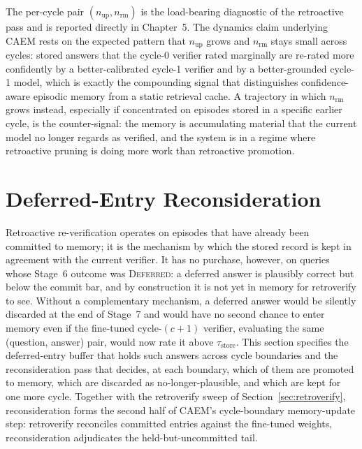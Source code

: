 The per-cycle pair $(n_{\text{up}}, n_{\text{rm}})$ is the load-bearing diagnostic of the retroactive pass and is reported directly in Chapter~5. The dynamics claim underlying CAEM rests on the expected pattern that $n_{\text{up}}$ grows and $n_{\text{rm}}$ stays small across cycles: stored answers that the cycle-0 verifier rated marginally are re-rated more confidently by a better-calibrated cycle-1 verifier and by a better-grounded cycle-1 model, which is exactly the compounding signal that distinguishes confidence-aware episodic memory from a static retrieval cache. A trajectory in which $n_{\text{rm}}$ grows instead, especially if concentrated on episodes stored in a specific earlier cycle, is the counter-signal: the memory is accumulating material that the current model no longer regards as verified, and the system is in a regime where retroactive pruning is doing more work than retroactive promotion.

\section{Deferred-Entry Reconsideration}
\label{sec:deferred-reconsider}

Retroactive re-verification operates on episodes that have already been committed to memory; it is the mechanism by which the stored record is kept in agreement with the current verifier. It has no purchase, however, on queries whose Stage~6 outcome was \textsc{Deferred}: a deferred answer is plausibly correct but below the commit bar, and by construction it is not yet in memory for retroverify to see. Without a complementary mechanism, a deferred answer would be silently discarded at the end of Stage~7 and would have no second chance to enter memory even if the fine-tuned cycle-$(c{+}1)$ verifier, evaluating the same (question, answer) pair, would now rate it above $\tau_{\text{store}}$. This section specifies the deferred-entry buffer that holds such answers across cycle boundaries and the reconsideration pass that decides, at each boundary, which of them are promoted to memory, which are discarded as no-longer-plausible, and which are kept for one more cycle. Together with the retroverify sweep of Section~\ref{sec:retroverify}, reconsideration forms the second half of CAEM's cycle-boundary memory-update step: retroverify reconciles committed entries against the fine-tuned weights, reconsideration adjudicates the held-but-uncommitted tail.


